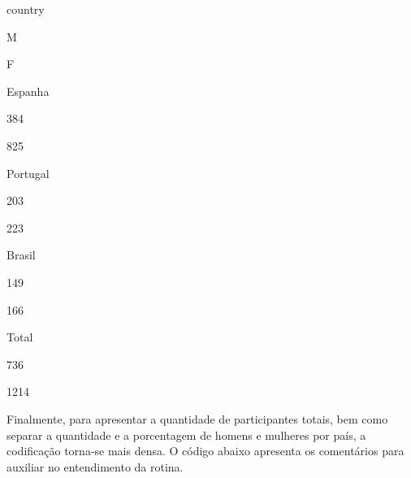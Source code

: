 \documentclass[
]{book}
\begin{document}
country

M

F

Espanha

384

825

Portugal

203

223

Brasil

149

166

Total

736

1214

Finalmente, para apresentar a quantidade de participantes totais, bem como separar a quantidade e a porcentagem de homens e mulheres por país, a codificação torna-se mais densa. O código abaixo apresenta os comentários para auxiliar no entendimento da rotina.
\end{document}

